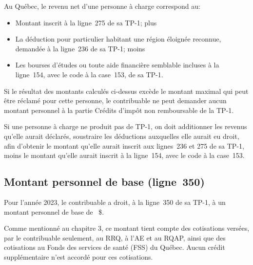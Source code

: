 Au Québec, le \og revenu net \fg{} d'une personne à charge correspond au:
\begin{itemize}
	\item Montant inscrit à la ligne~275 de sa TP-1; plus
	\item La déduction pour particulier habitant une région éloignée reconnue, demandée à la ligne~236 de sa TP-1; moins
	\item Les bourses d'études ou toute aide financière semblable incluses à la ligne~154, avec le code  \fg{} à la case~153, de sa TP-1.
\end{itemize}

Si le résultat des montants calculés ci-dessus excède le montant maximal qui peut être réclamé pour cette personne, le contribuable ne peut demander aucun montant personnel à la partie Crédits d'impôt non remboursable de la TP-1.

Si une personne à charge ne produit pas de TP-1, on doit additionner les revenus qu'elle aurait déclarés, soustraire les déductions auxquelles elle aurait eu droit, afin d'obtenir le montant qu'elle aurait inscrit aux lignes~236 et 275 de sa TP-1, moins le montant qu'elle aurait inscrit à la ligne~154, avec le code  \fg{} à la case~153.


\subsection{Montant personnel de base (ligne~350)}
Pour l'année 2023, le contribuable a droit, à la ligne~350 de sa TP-1, à un montant personnel de base de ~\$. 

Comme mentionné au chapitre 3, ce montant tient compte des cotisations versées, par le contribuable seulement, au RRQ, à l'AE et au RQAP, ainsi que des cotisations au Fonds des services de santé (FSS) du Québec. Aucun crédit supplémentaire n'est accordé pour ces cotisations. 



